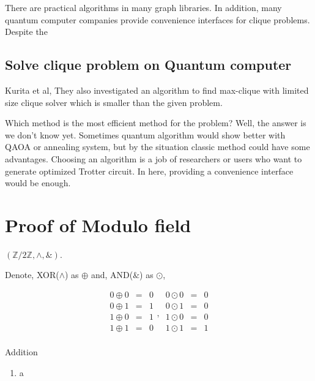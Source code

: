 \documentclass[a4paper,12pt]{article}
\begin{document}
There are practical algorithms in many graph libraries.%
 In addition, many quantum computer companies provide convenience interfaces for clique problems. 
Despite the

\subsection{Solve clique problem on Quantum computer}

Kurita et al, 
They also investigated an algorithm to find max-clique with limited size clique solver
which is smaller than the given problem.

Which method is the most efficient method for the problem? 
Well, the answer is we don't know yet. 
Sometimes quantum algorithm would show better with QAOA or annealing system,
but by the situation classic method could have some advantages.
Choosing an algorithm is a job of researchers or users who want to generate optimized 
Trotter circuit. In here, providing a convenience interface would be enough.

%

\appendix

\section{Proof of Modulo field}
\label{appendix:modulo_field}

$(\mathbb{Z}/2\mathbb{Z} ,\wedge , \&)$.

Denote, XOR($\wedge$) as $\oplus$ and, AND($\&$) as $\odot$,

\begin{equation}
    \begin{matrix}
        0 \oplus 0 & = &0\\
        0 \oplus 1 & = &1\\
        1 \oplus 0 & = &1\\
        1 \oplus 1 & = &0\\
    \end{matrix},\,
    \begin{matrix}
        0 \odot 0 & = &0\\
        0 \odot 1 & = &0\\
        1 \odot 0 & = &0\\
        1 \odot 1 & = &1\\
    \end{matrix}
\end{equation}

Addition 

\begin{enumerate}
    \item a
\end{enumerate}

  
  
\end{document}
